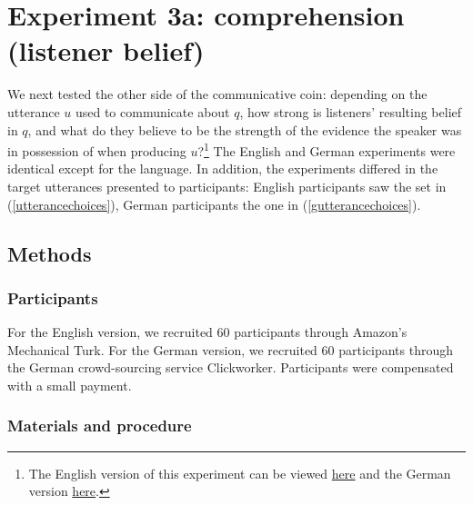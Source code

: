 \documentclass[11pt]{article}
\newcommand{\eref}[1]{(\ref{#1})}
\begin{document}
\section{Experiment 3a: comprehension (listener belief)}


We next tested the other side of the communicative coin: depending on the utterance $u$ used to communicate about $q$, how strong is listeners' resulting belief in $q$, and what do they believe to be the strength of the evidence the speaker was in possession of when producing $u$?\footnote{The English version of this experiment can be viewed \href{http://stanford.edu/~jdegen/72_modals_comprehension_evidence_room/modals.html}{here} and the German version \href{http://web.stanford.edu/~jdegen/cgi-bin/2_dp_comprehension_listenerbelief/modals.html}{here}.} The English and German experiments were identical except for the language. In addition, the experiments differed in the target utterances presented to participants: English participants saw the set in \eref{utterancechoices},  German participants the one in \eref{gutterancechoices}.

\subsection{Methods}

\subsubsection{Participants}

For the English version, we recruited 60 participants through Amazon's Mechanical Turk. 
For the German version, we recruited 60 participants through the German crowd-sourcing service Clickworker. Participants were compensated with a small payment.

\subsubsection{Materials and procedure}
\end{document}
